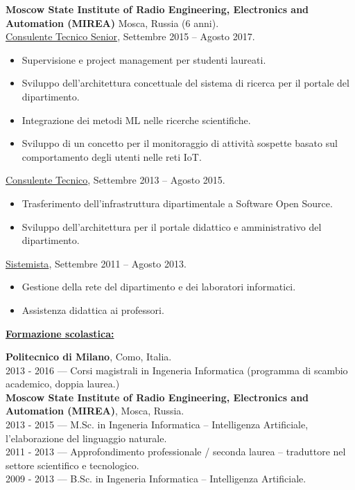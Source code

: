 \documentclass[a4paper,10pt,fullpage]{article}
\begin{document}
\textbf{Moscow State Institute of Radio Engineering, Electronics and Automation (MIREA)} Mosca, Russia (6 anni).\\
\underline{Consulente Tecnico Senior}, Settembre 2015 – Agosto 2017.
\begin{itemize}
	\item[--] Supervisione e project management per studenti laureati.
	\item[--] Sviluppo dell'architettura concettuale del sistema di ricerca per il portale del dipartimento.
	\item[--] Integrazione dei metodi ML nelle ricerche scientifiche.
	\item[--] Sviluppo di un concetto per il monitoraggio di attività sospette basato sul comportamento degli utenti nelle reti IoT.
\end{itemize}
\underline{Consulente Tecnico}, Settembre 2013 – Agosto 2015.
\begin{itemize}
	\item[--] Trasferimento dell'infrastruttura dipartimentale a Software Open Source.
	\item[--] Sviluppo dell'architettura per il portale didattico e amministrativo del dipartimento.
\end{itemize}
\underline{Sistemista}, Settembre 2011 – Agosto 2013.
\begin{itemize}
	\item[--] Gestione della rete del dipartimento e dei laboratori informatici.
	\item[--] Assistenza didattica ai professori.
\end{itemize}


\begin{center}
	\underline{\textbf{\large Formazione scolastica:}}
\end{center}	
\textbf{Politecnico di Milano}, Como, Italia.\\
2013 - 2016 --- Corsi magistrali in Ingeneria Informatica (programma di scambio academico, doppia laurea.)\\

\textbf{Moscow State Institute of Radio Engineering, Electronics and Automation (MIREA)}, Mosca,
Russia.\\
2013 - 2015 --- M.Sc. in Ingeneria Informatica -- Intelligenza Artificiale, l'elaborazione del linguaggio naturale.\\
2011 - 2013 --- Approfondimento professionale / seconda laurea -- traduttore nel settore scientifico e tecnologico. \\
2009 - 2013 --- B.Sc. in Ingeneria Informatica -- Intelligenza Artificiale.
\end{document}

